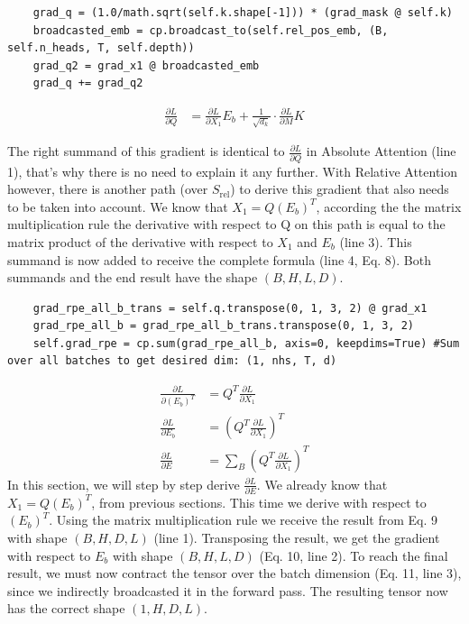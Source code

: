 \documentclass[a4paper,12pt]{extarticle}
\begin{document}
\begin{lstlisting}
    grad_q = (1.0/math.sqrt(self.k.shape[-1])) * (grad_mask @ self.k)
    broadcasted_emb = cp.broadcast_to(self.rel_pos_emb, (B, self.n_heads, T, self.depth))
    grad_q2 = grad_x1 @ broadcasted_emb
    grad_q += grad_q2
\end{lstlisting}
\begin{align}
\frac{\partial L}{\partial Q}
&= \frac{\partial L}{\partial X_1}E_b + \frac{1}{\sqrt{d_k}} \cdot\frac{\partial L}{\partial M}K
\end{align}

The right summand of this gradient is identical to $\frac{\partial L}{\partial Q}$ in Absolute Attention (line 1), that's why there is no need to explain it any further. With Relative Attention however, there is another path (over $S_\text{rel}$) to derive this gradient that also needs to be taken into account. We know that $X_1 = Q(E_b)^T$, according the the matrix multiplication rule the derivative with respect to Q on this path is equal to the matrix product of the derivative with respect to $X_1$ and $E_b$ (line 3). This summand is now added to receive the complete formula (line 4, Eq. 8). Both summands and the end result have the shape $(B, H, L, D)$.
\newline
\vspace{0.1cm}
\begin{lstlisting}
    grad_rpe_all_b_trans = self.q.transpose(0, 1, 3, 2) @ grad_x1
    grad_rpe_all_b = grad_rpe_all_b_trans.transpose(0, 1, 3, 2)
    self.grad_rpe = cp.sum(grad_rpe_all_b, axis=0, keepdims=True) #Sum over all batches to get desired dim: (1, nhs, T, d)
\end{lstlisting}
\begin{align}
\frac{\partial L}{\partial (E_b)^T}
&= Q^T\frac{\partial L}{\partial X_1} \\[0.2cm]
\frac{\partial L}{\partial E_b}
&= \left(Q^T\frac{\partial L}{\partial X_1}\right)^T \\[0.2cm]
\frac{\partial L}{\partial E}
&= \sum_B\left(Q^T\frac{\partial L}{\partial X_1}\right)^T
\end{align}
In this section, we will step by step derive $\frac{\partial L}{\partial E}$. We already know that  $X_1 = Q(E_b)^T$, from previous sections. This time we derive with respect to $(E_b)^T$. Using the matrix multiplication rule we receive the result from Eq. 9 with shape $(B, H, D, L)$ (line 1). Transposing the result, we get the gradient with respect to $E_b$ with shape $(B, H, L, D)$ (Eq. 10, line 2). To reach the final result, we must now contract the tensor over the batch dimension (Eq. 11, line 3), since we indirectly broadcasted it in the forward pass. The resulting tensor now has the correct shape $(1, H, D, L)$.
\end{document}
